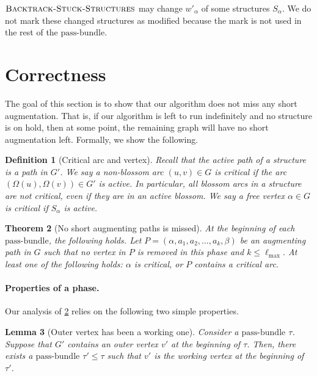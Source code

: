 \documentclass{article}
\newcommand{\alp}{\alpha}
\newcommand{\Omg}{\Omega}
\newcommand{\lmax}{\ell_{\max}}
\newcommand{\bundle}{\text{pass-bundle}\xspace}
\newcommand{\algBacktrack}{\textsc{Backtrack-Stuck-Structures}\xspace}
\newtheorem{theorem}{Theorem}[section]
\newtheorem{lemma}[theorem]{Lemma}
\newtheorem{definition}[theorem]{Definition}
\begin{document}
$\algBacktrack$ may change $w'_\alp$ of some structures $S_\alp$. We do not mark these changed structures as modified because the mark is not used in the rest of the $\bundle$.











\section{Correctness}
\label{sec:correctness}
The goal of this section is to show that our algorithm does not miss any short augmentation. That is, if our algorithm is left to run indefinitely and no structure is on hold, then at some point, the remaining graph will have no short augmentation left. 
Formally, 
we show the following.


\begin{definition}[Critical arc and vertex]
\label{def:critical}
Recall that the active path of a structure is a path in $G'$.
We say a non-blossom arc $(u, v) \in G$ is \emph{critical} if the arc $(\Omg(u), \Omg(v)) \in G'$ is active.
In particular, all blossom arcs in a structure are not critical, even if they are in an active blossom.
We say a free vertex $\alp \in G$ is \emph{critical} if $S_\alp$ is active.
\end{definition}

\begin{theorem}[No short augmenting paths is missed] \label{lem:active}
At the beginning of each $\bundle$, the following holds.
Let $P = (\alp, a_1, a_2, \dots, a_k, \beta)$ be an augmenting path in $G$ such that no vertex in $P$ is removed in this phase and $k \leq \lmax$.
At least one of the following holds: $\alp$ is critical, or $P$ contains a critical arc. 
\end{theorem}

\paragraph{Properties of a phase.}


Our analysis of \cref{lem:active} relies on the following two simple properties.

\begin{lemma}[Outer vertex has been a working one]
\label{lem:working} 
Consider a $\bundle$ $\tau$. Suppose that $G'$ contains an outer vertex $v'$ at the beginning of $\tau$. Then, there exists a $\bundle$ $\tau' \leq \tau$ such that $v'$ is the working vertex at the beginning of $\tau'$.
\end{lemma}
\end{document}
